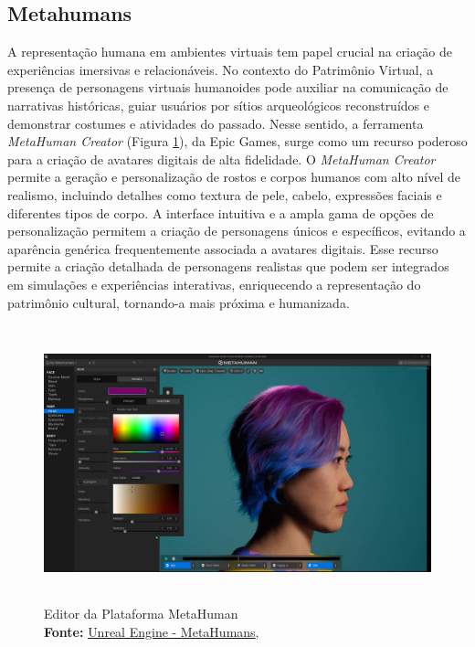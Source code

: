 \subsection{Metahumans}

A representação humana em ambientes virtuais tem papel crucial na criação de experiências imersivas e relacionáveis. No contexto do Patrimônio Virtual, a presença de personagens virtuais humanoides pode auxiliar na comunicação de narrativas históricas, guiar usuários por sítios arqueológicos reconstruídos e demonstrar costumes e atividades do passado. Nesse sentido, a ferramenta \textit{MetaHuman Creator} (Figura \ref{fig:metahuman creator}), da Epic Games, surge como um recurso poderoso para a criação de avatares digitais de alta fidelidade.
O \textit{MetaHuman Creator} permite a geração e personalização de rostos e corpos humanos com alto nível de realismo, incluindo detalhes como textura de pele, cabelo, expressões faciais e diferentes tipos de corpo. A interface intuitiva e a ampla gama de opções de personalização permitem a criação de personagens únicos e específicos, evitando a aparência genérica frequentemente associada a avatares digitais. Esse recurso permite a criação detalhada de personagens realistas que podem ser integrados em simulações e experiências interativas, enriquecendo a representação do patrimônio cultural, tornando-a mais próxima e humanizada.

\begin{figure}[H]
    \centering
    \includegraphics[height=8cm, keepaspectratio]{img/unreal/metahuman create.jpg}
    \caption{Editor da Plataforma MetaHuman \\
        \textbf{Fonte:} \href{https://cdn2.unrealengine.com/metahuman-overview-create-1920x1080-baa630fe8b02.jpg?resize=1&w=900}{Unreal Engine - MetaHumans},  \protect\citep{unrealenginemeta}}
    \label{fig:metahuman creator}
\end{figure}


